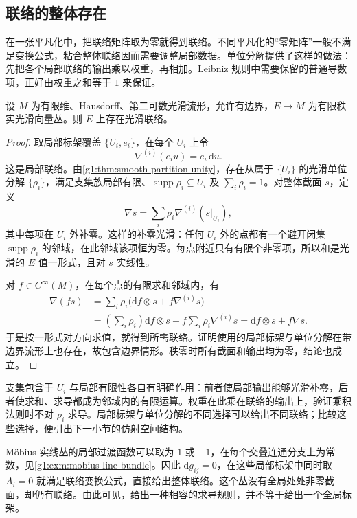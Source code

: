 \subsection{联络的整体存在}
\label{g1:subsec:1501:02}

在一张平凡化中，把联络矩阵取为零就得到联络。不同平凡化的“零矩阵”一般不满足变换公式，粘合整体联络因而需要调整局部数据。单位分解提供了这样的做法：先把各个局部联络的输出乘以权重，再相加。Leibniz 规则中需要保留的普通导数项，正好由权重之和等于 \(1\) 来保证。

\begin{theorem}\label{g1:thm:connection-existence}
	设 \(M\) 为有限维、Hausdorff、第二可数光滑流形，允许有边界，\(E\to M\) 为有限秩实光滑向量丛。则 \(E\) 上存在光滑联络。
\end{theorem}
\begin{proof}
	取局部标架覆盖 \(\{U_i,e_i\}\)，在每个 \(U_i\) 上令
	\[
		\nabla^{(i)}(e_i u)=e_i\,\mathrm{d}u.
	\]
	这是局部联络。由\cref{g1:thm:smooth-partition-unity}，存在从属于 \(\{U_i\}\) 的光滑单位分解 \(\{\rho_i\}\)，满足支集族局部有限、\(\operatorname{supp}\rho_i\subseteq U_i\) 及 \(\sum_i\rho_i=1\)。对整体截面 \(s\)，定义
	\[
		\nabla s=\sum_i\rho_i\nabla^{(i)}(s|_{U_i}),
	\]
	其中每项在 \(U_i\) 外补零。这样的补零光滑：任何 \(U_i\) 外的点都有一个避开闭集 \(\operatorname{supp}\rho_i\) 的邻域，在此邻域该项恒为零。每点附近只有有限个非零项，所以和是光滑的 \(E\) 值一形式，且对 \(s\) 实线性。

	对 \(f\in C^\infty(M)\)，在每个点的有限求和邻域内，有
	\begin{align*}
		\nabla(fs)
		&=\sum_i\rho_i\bigl(\mathrm{d}f\otimes s+f\nabla^{(i)}s\bigr)\\
		&=\left(\sum_i\rho_i\right)\mathrm{d}f\otimes s+f\sum_i\rho_i\nabla^{(i)}s
		=\mathrm{d}f\otimes s+f\nabla s.
	\end{align*}
	于是按一形式对方向求值，就得到所需联络。证明使用的局部标架与单位分解在带边界流形上也存在，故包含边界情形。秩零时所有截面和输出均为零，结论也成立。
\end{proof}

支集包含于 \(U_i\) 与局部有限性各自有明确作用：前者使局部输出能够光滑补零，后者使求和、求导都成为邻域内的有限运算。权重在此乘在联络的输出上，验证乘积法则时不对 \(\rho_i\) 求导。局部标架与单位分解的不同选择可以给出不同联络；比较这些选择，便引出下一小节的仿射空间结构。

\begin{example}
	Möbius 实线丛的局部过渡函数可以取为 \(1\) 或 \(-1\)，在每个交叠连通分支上为常数，见\cref{g1:exm:mobius-line-bundle}。因此 \(\mathrm{d}g_{ij}=0\)，在这些局部标架中同时取 \(A_i=0\) 就满足联络变换公式，直接给出整体联络。这个丛没有全局处处非零截面，却仍有联络。由此可见，给出一种相容的求导规则，并不等于给出一个全局标架。
\end{example}

